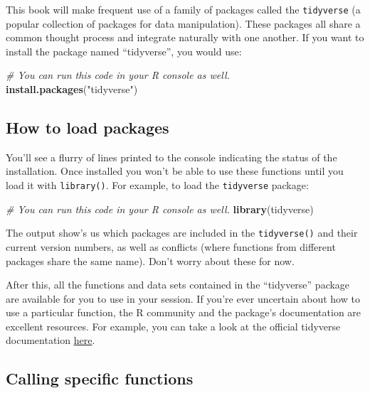 \documentclass[
]{book}
\newenvironment{Shaded}{\begin{snugshade}}{\end{snugshade}}
\newcommand{\CommentTok}[1]{\textcolor[rgb]{0.56,0.35,0.01}{\textit{#1}}}
\newcommand{\FunctionTok}[1]{\textcolor[rgb]{0.13,0.29,0.53}{\textbf{#1}}}
\newcommand{\NormalTok}[1]{#1}
\newcommand{\StringTok}[1]{\textcolor[rgb]{0.31,0.60,0.02}{#1}}
\begin{document}
This book will make frequent use of a family of packages called the \texttt{tidyverse} (a popular collection of packages for data manipulation). These packages all share a common thought process and integrate naturally with one another. If you want to install the package named ``tidyverse'', you would use:

\begin{Shaded}
\begin{Highlighting}[]
\CommentTok{\# You can run this code in your R console as well. }
\FunctionTok{install.packages}\NormalTok{(}\StringTok{"tidyverse"}\NormalTok{)}
\end{Highlighting}
\end{Shaded}

\hypertarget{how-to-load-packages}{%
\subsection{How to load packages}\label{how-to-load-packages}}

You'll see a flurry of lines printed to the console indicating the status of the installation. Once installed you won't be able to use these functions until you load it with \texttt{library()}. For example, to load the \texttt{tidyverse} package:

\begin{Shaded}
\begin{Highlighting}[]
\CommentTok{\# You can run this code in your R console as well. }
\FunctionTok{library}\NormalTok{(tidyverse)}
\end{Highlighting}
\end{Shaded}

The output show's us which packages are included in the \texttt{tidyverse()} and their current version numbers, as well as conflicts (where functions from different packages share the same name). Don't worry about these for now.

After this, all the functions and data sets contained in the ``tidyverse'' package are available for you to use in your session. If you're ever uncertain about how to use a particular function, the R community and the package's documentation are excellent resources. For example, you can take a look at the official tidyverse documentation \href{https://tidyverse.tidyverse.org/}{here}.

\hypertarget{calling-specific-functions}{%
\subsection{Calling specific functions}\label{calling-specific-functions}}
\end{document}
